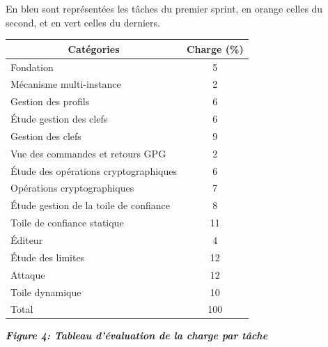 \documentclass{../res/univ-projet}
\begin{document}
En bleu sont représentées les tâches du premier sprint, en orange celles du second, et en vert celles du derniers.
\begin{center}
  \begin{tabular}{|l|l|}
    \hline
    \multicolumn{1}{|c|}{\cellcolor{gray} \color{white}Catégories} & \multicolumn{1}{|c|}{\cellcolor{gray} \color{white}Charge (\%)} \\
    \hline
    \cellcolor{bleu}\color{white}Fondation & \multicolumn{1}{|c|}{\cellcolor{bleu}\color{white}5} \\
    \hline
    \cellcolor{bleu}\color{white}Mécanisme multi-instance & \multicolumn{1}{|c|}{\cellcolor{bleu}\color{white}2} \\    
    \hline
    \cellcolor{bleu}\color{white}Gestion des profils & \multicolumn{1}{|c|}{\cellcolor{bleu}\color{white}6} \\
    \hline
    \cellcolor{bleu}\color{white}\'{E}tude gestion des clefs & \multicolumn{1}{|c|}{\cellcolor{bleu}\color{white}6} \\
    \hline
    \cellcolor{bleu}\color{white}Gestion des clefs & \multicolumn{1}{|c|}{\cellcolor{bleu}\color{white}9} \\
    \hline
    \cellcolor{bleu}\color{white}Vue des commandes et retours GPG & \multicolumn{1}{|c|}{\cellcolor{bleu}\color{white}2} \\
    \hline
    \cellcolor{orange}\color{white}\'{E}tude des opérations cryptographiques & \multicolumn{1}{|c|}{\cellcolor{orange}\color{white}6} \\
    \hline
    \cellcolor{orange}\color{white}Opérations cryptographiques & \multicolumn{1}{|c|}{\cellcolor{orange}\color{white}7} \\
    \hline
    \cellcolor{orange}\color{white}\'{E}tude gestion de la toile de confiance & \multicolumn{1}{|c|}{\cellcolor{orange}\color{white}8} \\
    \hline
    \cellcolor{orange}\color{white}Toile de confiance statique & \multicolumn{1}{|c|}{\cellcolor{orange}\color{white}11} \\
    \hline
    \cellcolor{orange}\color{white}\'{E}diteur & \multicolumn{1}{|c|}{\cellcolor{orange}\color{white}4} \\
    \hline
    \cellcolor{vert}\color{white}\'{E}tude des limites & \multicolumn{1}{|c|}{\cellcolor{vert}\color{white}12} \\
    \hline
    \cellcolor{vert}\color{white}Attaque & \multicolumn{1}{|c|}{\cellcolor{vert}\color{white}12} \\
    \hline
    \cellcolor{vert}\color{white}Toile dynamique & \multicolumn{1}{|c|}{\cellcolor{vert}\color{white}10} \\
    \hline
    Total & \multicolumn{1}{|c|}{100} \\
    \hline
  \end{tabular}
\end{center}
\begin{center}
 \textbf{\textit{Figure 4: Tableau d'évaluation de la charge par tâche}}
\end{center}
\end{document}
